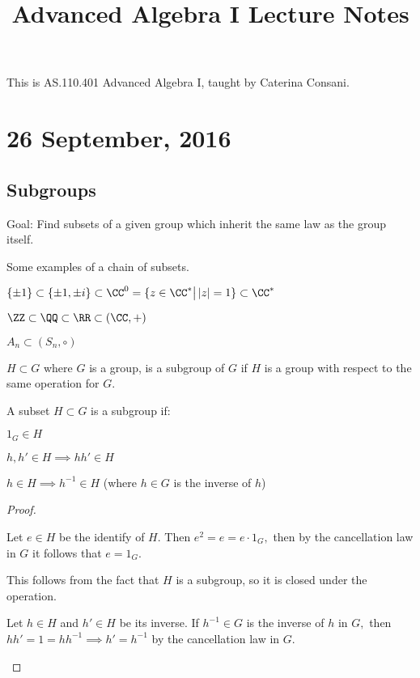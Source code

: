\documentclass{article}
\begin{document}
\title{Advanced Algebra I Lecture Notes}
\maketitle
	This is AS.110.401 Advanced Algebra I, taught by Caterina Consani.

\thispagestyle{fancy}

\tableofcontents

\newpage

\section{26 September, 2016}
\subsection{Subgroups}

Goal: Find subsets of a given group which inherit the same law as the group itself.

\begin{example*}
	Some examples of a chain of subsets.
	\begin{itemize}
		\ii $\{\pm 1\} \subset \{\pm 1, \pm i\} \subset \CC^0 = \{z\in\CC^* \big\vert\, |z|=1\} \subset \CC^*$

		\ii $\ZZ\subset\QQ\subset\RR\subset(\CC, +)$

		\ii $A_n\subset(S_n, \circ)$
	\end{itemize}
\end{example*}

\begin{definition*}
	$H\subset G$ where $G$ is a group, is a subgroup of $G$ if $H$ is a group with respect to the same operation for $G.$
\end{definition*}

\begin{theorem*}
	A subset $H\subset G$ is a subgroup if:
	\begin{enumerate}
		\ii $1_G\in H$ 

		\ii $h, h'\in H\implies hh'\in H$

		\ii $h\in H\implies h^{-1}\in H$ (where $h\in G$ is the inverse of $h$)
	\end{enumerate}
\end{theorem*}

\begin{proof}
	\begin{enumerate}
		\ii Let $e\in H$ be the identify of $H.$ Then $e^2=e=e\cdot1_G,$ then by the cancellation law in $G$ it follows that $e=1_G.$

		\ii This follows from the fact that $H$ is a subgroup, so it is closed under the operation.

		\ii Let $h\in H$ and $h'\in H$ be its inverse. If $h^{-1}\in G$ is the inverse of $h$ in $G,$ then $hh'=1=hh^{-1}\implies h'=h^{-1}$ by the cancellation law in $G.$
	\end{enumerate}
\end{proof}
\end{document}
